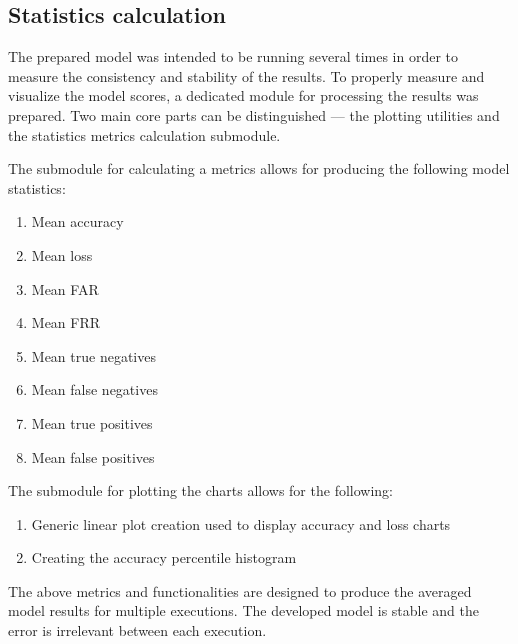 \subsection{Statistics calculation}\label{subsec:statistics-calculation}
The prepared model was intended to be running several times in order to measure the consistency and stability of the results.
To properly measure and visualize the model scores, a dedicated module for processing the results was prepared.
Two main core parts can be distinguished --- the plotting utilities and the statistics metrics calculation submodule.

The submodule for calculating a metrics allows for producing the following model statistics:
\begin{enumerate}
    \item Mean accuracy
    \item Mean loss
    \item Mean FAR
    \item Mean FRR
    \item Mean true negatives
    \item Mean false negatives
    \item Mean true positives
    \item Mean false positives
\end{enumerate}

The submodule for plotting the charts allows for the following:
\begin{enumerate}
    \item Generic linear plot creation used to display accuracy and loss charts
    \item Creating the accuracy percentile histogram
\end{enumerate}

The above metrics and functionalities are designed to produce the averaged model results for multiple executions.
The developed model is stable and the error is irrelevant between each execution.
